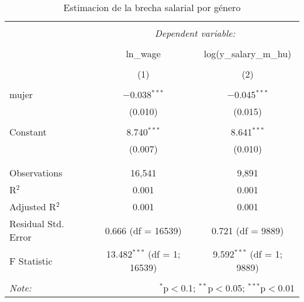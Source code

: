 
\begin{table}[!htbp] \centering 
  \caption{Estimacion de la brecha salarial por género} 
  \label{} 
\begin{tabular}{@{\extracolsep{5pt}}lcc} 
\\[-1.8ex]\hline 
\hline \\[-1.8ex] 
 & \multicolumn{2}{c}{\textit{Dependent variable:}} \\ 
\cline{2-3} 
\\[-1.8ex] & ln\_wage & log(y\_salary\_m\_hu) \\ 
\\[-1.8ex] & (1) & (2)\\ 
\hline \\[-1.8ex] 
 mujer & $-$0.038$^{***}$ & $-$0.045$^{***}$ \\ 
  & (0.010) & (0.015) \\ 
  & & \\ 
 Constant & 8.740$^{***}$ & 8.641$^{***}$ \\ 
  & (0.007) & (0.010) \\ 
  & & \\ 
\hline \\[-1.8ex] 
Observations & 16,541 & 9,891 \\ 
R$^{2}$ & 0.001 & 0.001 \\ 
Adjusted R$^{2}$ & 0.001 & 0.001 \\ 
Residual Std. Error & 0.666 (df = 16539) & 0.721 (df = 9889) \\ 
F Statistic & 13.482$^{***}$ (df = 1; 16539) & 9.592$^{***}$ (df = 1; 9889) \\ 
\hline 
\hline \\[-1.8ex] 
\textit{Note:}  & \multicolumn{2}{r}{$^{*}$p$<$0.1; $^{**}$p$<$0.05; $^{***}$p$<$0.01} \\ 
\end{tabular} 
\end{table} 

